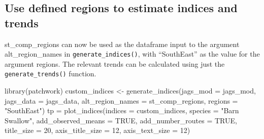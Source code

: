 \documentclass[
]{book}
\newenvironment{Shaded}{\begin{snugshade}}{\end{snugshade}}
\newcommand{\AttributeTok}[1]{\textcolor[rgb]{0.77,0.63,0.00}{#1}}
\newcommand{\ConstantTok}[1]{\textcolor[rgb]{0.00,0.00,0.00}{#1}}
\newcommand{\DecValTok}[1]{\textcolor[rgb]{0.00,0.00,0.81}{#1}}
\newcommand{\FunctionTok}[1]{\textcolor[rgb]{0.00,0.00,0.00}{#1}}
\newcommand{\NormalTok}[1]{#1}
\newcommand{\OtherTok}[1]{\textcolor[rgb]{0.56,0.35,0.01}{#1}}
\newcommand{\SpecialCharTok}[1]{\textcolor[rgb]{0.00,0.00,0.00}{#1}}
\newcommand{\StringTok}[1]{\textcolor[rgb]{0.31,0.60,0.02}{#1}}
\begin{document}
\begin{Shaded}
\end{Shaded}

\hypertarget{use-defined-regions-to-estimate-indices-and-trends}{%
\subsection{Use defined regions to estimate indices and trends}\label{use-defined-regions-to-estimate-indices-and-trends}}

st\_comp\_regions can now be used as the dataframe input to the argument alt\_region\_names in \texttt{generate\_indices()}, with ``SouthEast'' as the value for the argument regions. The relevant trends can be calculated using just the \texttt{generate\_trends()} function.

\begin{Shaded}
\begin{Highlighting}[]
\FunctionTok{library}\NormalTok{(patchwork)}
\NormalTok{custom\_indices }\OtherTok{\textless{}{-}} \FunctionTok{generate\_indices}\NormalTok{(}\AttributeTok{jags\_mod =}\NormalTok{ jags\_mod,}
                                      \AttributeTok{jags\_data =}\NormalTok{ jags\_data,}
                                      \AttributeTok{alt\_region\_names =}\NormalTok{ st\_comp\_regions,}
                                      \AttributeTok{regions =} \StringTok{"SouthEast"}\NormalTok{)}
\NormalTok{tp }\OtherTok{=} \FunctionTok{plot\_indices}\NormalTok{(}\AttributeTok{indices =}\NormalTok{ custom\_indices,}
                         \AttributeTok{species =} \StringTok{"Barn Swallow"}\NormalTok{,}
                  \AttributeTok{add\_observed\_means =} \ConstantTok{TRUE}\NormalTok{,}
                  \AttributeTok{add\_number\_routes =} \ConstantTok{TRUE}\NormalTok{,}
  \AttributeTok{title\_size =} \DecValTok{20}\NormalTok{,}
  \AttributeTok{axis\_title\_size =} \DecValTok{12}\NormalTok{,}
  \AttributeTok{axis\_text\_size =} \DecValTok{12}\NormalTok{)}
\end{Highlighting}
\end{Shaded}
\end{document}
